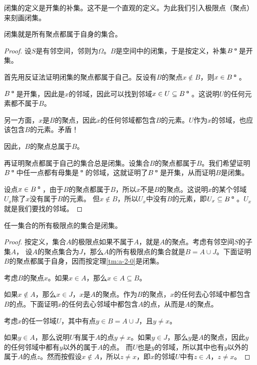\documentclass[12pt,UTF8]{ctexbook}
\begin{document}
\begin{appendix}
闭集的定义是开集的补集。这不是一个直观的定义。为此我们引入极限点（聚点）来刻画闭集。

\begin{tm}\label{tm:a-2-0}
    闭集就是所有聚点都属于自身的集合。
\end{tm}

\begin{proof}
    设$S$是有邻空间，邻则为$\Omega$。$B$是空间中的闭集，于是按定义，补集$B^{\bu}$是开集。

    首先用反证法证明闭集的聚点都属于自己。反设有$B$的聚点$x\notin B$，则$x\in B^{\bu}$。

    $B^{\bu}$是开集，因此是$x$的邻域，因此可以找到邻域$x\in U \subseteq B^{\bu}$。这说明$U$的任何元素都不属于$B$。

    另一方面，$x$是$B$的聚点，因此$x$的任何邻域都包含$B$的元素。$U$作为$x$的邻域，也应该包含$B$的元素。矛盾！

    因此，$B$的聚点总属于$B$。

    再证明聚点都属于自己的集合总是闭集。设集合$B$的聚点都属于$B$。我们希望证明$B^{\bu}$中任一点都有母集是$^{\bu}$的邻域，这就证明了$B^{\bu}$是开集，从而证明$B$是闭集。

    设点$x\in B^{\bu}$，由于$B$的聚点都属于$B$，所以$x$不是$B$的聚点。这说明$x$的某个邻域$U_x$除了$x$没有属于$B$的元素。
    但$x \notin B$，所以$U_x$中没有$B$的元素，即$U_x\subseteq B^{\bu}$。$U_x$就是我们要找的邻域。

\end{proof}

\begin{tm}\label{tm:a-2-10}
    任一集合的所有极限点的集合是闭集。
\end{tm}

\begin{proof}
    按定义，集合$A$的极限点如果不属于$A$，就是$A$的聚点。考虑有邻空间$S$的子集$A$，
    设$A$的聚点集合为$J$，那么$A$的所有极限点的集合就是$B = A\cup J$。下面证明$B$的聚点都属于自身，因而按定理\ref{tm:a-2-0}是闭集。

    考虑$B$的聚点$x$。如果$x\in A$，那么$x\in A\subseteq B$。
    
    如果$x\notin A$，那么$x\in J$，$x$是$A$的聚点。作为$B$的聚点，$x$的任何去心邻域中都包含$B$的点。下面证明$x$的任何去心邻域中都包含$A$的点，从而是$A$的聚点。
    
    考虑$x$的任一邻域$U$，其中有点$y\in B = A\cup J$，且$y\neq x$。

    如果$y \in A$，那么说明$U$有属于$A$的点$y\neq x$。如果$y \in J$，那么$y$是$A$的聚点，因此$y$的任何邻域中都有$y$以外的属于$A$的点。
    而$U$也是$y$的邻域，所以其中也有$y$以外的属于$A$的点$z$。然而按假设$x\notin A$，所以$z \neq x$，即$x$的邻域$U$中有$z\in A$，$z\neq x$。


\end{proof}
\end{appendix}
\end{document}
